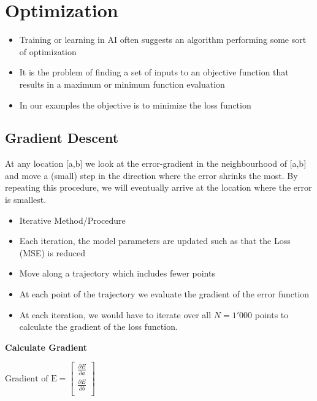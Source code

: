 \section{Optimization}
\begin{itemize}
    \item Training or learning in AI often suggests an algorithm performing some sort of optimization
    \item It is the problem of finding a set of inputs to an objective function that results in a maximum or minimum function evaluation
    \item In our examples the objective is to minimize the loss function
\end{itemize}

\subsection{Gradient Descent}
At any location [a,b] we look at the error-gradient in the neighbourhood of [a,b] and move a (small) step in the direction where the error shrinks the most.
By repeating this procedure, we will eventually arrive at the location where the error is smallest.

\begin{itemize}
    \item Iterative Method/Procedure
    \item Each iteration, the model parameters are updated such as that the Loss (MSE) is reduced
    \item Move along a trajectory which includes fewer points
    \item At each point of the trajectory we evaluate the gradient of the error function
    \item At each iteration, we would have to iterate over all $N = 1'000$ points to calculate the gradient of the loss function.
\end{itemize}

\textbf{Calculate Gradient}

\begin{center}
    $
    \textrm{Gradient of E} = \begin{bmatrix}
                                 \frac{\partial E}{\partial a} \\
                                 \frac{\partial E}{\partial b} \\
    \end{bmatrix}
    $
\end{center}


